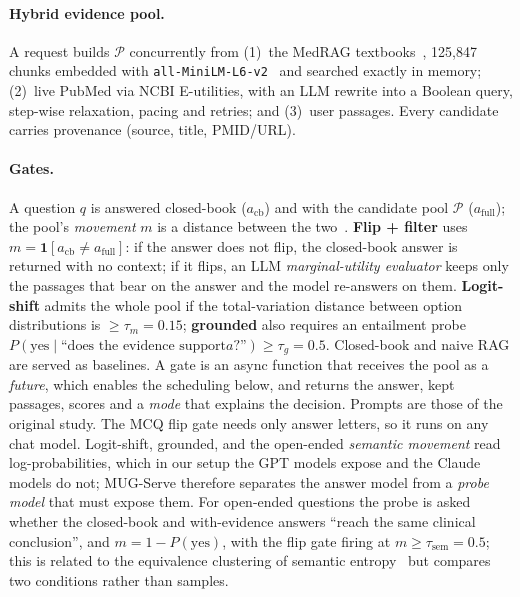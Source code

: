 \documentclass[11pt]{article}
\begin{document}
\paragraph{Hybrid evidence pool.} A request builds $\mathcal{P}$ concurrently
from (1)~the MedRAG textbooks~\citep{medrag}, 125{,}847 chunks embedded with
\texttt{all-MiniLM-L6-v2}~\citep{minilm} and searched exactly in memory;
(2)~live PubMed via NCBI E-utilities, with an LLM rewrite into a Boolean query,
step-wise relaxation, pacing and retries; and (3)~user passages. Every
candidate carries provenance (source, title, PMID/URL).

\paragraph{Gates.} A question $q$ is answered closed-book ($a_{\mathrm{cb}}$)
and with the candidate pool $\mathcal{P}$ ($a_{\mathrm{full}}$); the pool's
\emph{movement} $m$ is a distance between the two~\citep{mug}.
\textbf{Flip + filter} uses $m=\mathbf{1}[a_{\mathrm{cb}}\neq a_{\mathrm{full}}]$:
if the answer does not flip, the closed-book answer is returned with no context;
if it flips, an LLM \emph{marginal-utility evaluator} keeps only the passages
that bear on the answer and the model re-answers on them.
\textbf{Logit-shift} admits the whole pool if the total-variation distance
between option distributions is $\ge\tau_m{=}0.15$; \textbf{grounded} also
requires an entailment probe $P(\text{yes}\mid\text{``does the evidence support
}a\text{?''})\ge\tau_g{=}0.5$. Closed-book and naive RAG are served as
baselines. A gate is an async function that receives the pool as a
\emph{future}, which enables the scheduling below, and returns the answer, kept
passages, scores and a \emph{mode} that explains the decision. Prompts are those
of the original study. The MCQ flip gate needs only answer letters, so it runs
on any chat model. Logit-shift, grounded, and the open-ended
\emph{semantic movement} read log-probabilities, which in our setup the GPT
models expose and the Claude models do not; MUG-Serve therefore separates the
answer model from a \emph{probe model} that must expose them. For open-ended
questions the probe is asked whether the closed-book and with-evidence answers
``reach the same clinical conclusion'', and $m{=}1{-}P(\text{yes})$, with the
flip gate firing at $m\ge\tau_{\mathrm{sem}}{=}0.5$; this is related to the
equivalence clustering of semantic entropy~\citep{semanticentropy} but compares
two conditions rather than samples.
\end{document}
